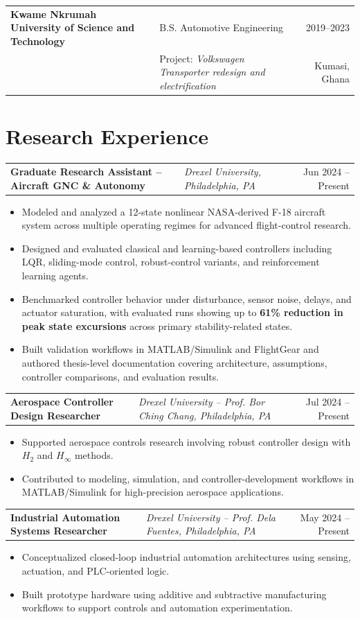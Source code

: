 \documentclass[10pt,letterpaper]{article}
\makeatletter
\newenvironment{role}[4]
{
\begin{tabularx}{\textwidth}{@{}l Y r@{}}
\textbf{#1} & \textit{#2, #3} & #4
\end{tabularx}
\vspace{-0.45em}
\begin{itemize}[leftmargin=1.15em, itemsep=0.14em, topsep=0.15em]
}
{
\end{itemize}
\vspace{0.05em}
}
\makeatother
\begin{document}
\vspace{0.2em}

\begin{tabularx}{\textwidth}{@{}l Y r@{}}
\textbf{Kwame Nkrumah University of Science and Technology} & B.S. Automotive Engineering & 2019--2023 \\
& Project: \textit{Volkswagen Transporter redesign and electrification} & Kumasi, Ghana
\end{tabularx}

\section{Research Experience}

\begin{role}
{Graduate Research Assistant -- Aircraft GNC \& Autonomy}
{Drexel University}
{Philadelphia, PA}
{Jun 2024 -- Present}
    \item Modeled and analyzed a 12-state nonlinear NASA-derived F-18 aircraft system across multiple operating regimes for advanced flight-control research.
    \item Designed and evaluated classical and learning-based controllers including LQR, sliding-mode control, robust-control variants, and reinforcement learning agents.
    \item Benchmarked controller behavior under disturbance, sensor noise, delays, and actuator saturation, with evaluated runs showing up to \textbf{61\% reduction in peak state excursions} across primary stability-related states.
    \item Built validation workflows in MATLAB/Simulink and FlightGear and authored thesis-level documentation covering architecture, assumptions, controller comparisons, and evaluation results.
\end{role}

\begin{role}
{Aerospace Controller Design Researcher}
{Drexel University -- Prof. Bor Ching Chang}
{Philadelphia, PA}
{Jul 2024 -- Present}
    \item Supported aerospace controls research involving robust controller design with $H_2$ and $H_\infty$ methods.
    \item Contributed to modeling, simulation, and controller-development workflows in MATLAB/Simulink for high-precision aerospace applications.
\end{role}

\begin{role}
{Industrial Automation Systems Researcher}
{Drexel University -- Prof. Dela Fuentes}
{Philadelphia, PA}
{May 2024 -- Present}
    \item Conceptualized closed-loop industrial automation architectures using sensing, actuation, and PLC-oriented logic.
    \item Built prototype hardware using additive and subtractive manufacturing workflows to support controls and automation experimentation.
\end{role}
\end{document}
